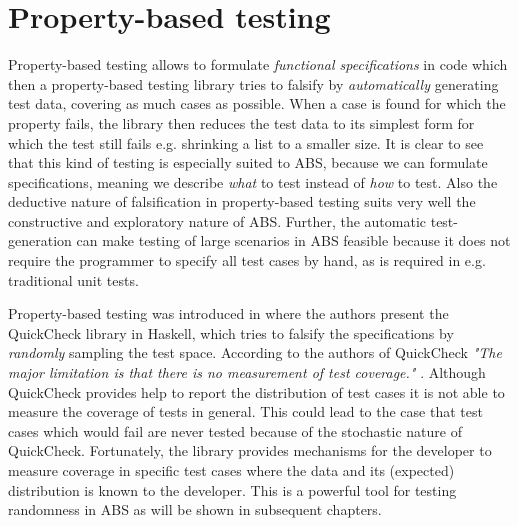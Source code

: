 \section*{Property-based testing}
\label{sec:proptesting}

Property-based testing allows to formulate \textit{functional specifications} in code which then a property-based testing library tries to falsify by \textit{automatically} generating test data, covering as much cases as possible. When a case is found for which the property fails, the library then reduces the test data to its simplest form for which the test still fails e.g. shrinking a list to a smaller size. It is clear to see that this kind of testing is especially suited to ABS, because we can formulate specifications, meaning we describe \textit{what} to test instead of \textit{how} to test. Also the deductive nature of falsification in property-based testing suits very well the constructive and exploratory nature of ABS. Further, the automatic test-generation can make testing of large scenarios in ABS feasible because it does not require the programmer to specify all test cases by hand, as is required in e.g. traditional unit tests.

Property-based testing was introduced in \cite{claessen_quickcheck_2000,claessen_testing_2002} where the authors present the QuickCheck library in Haskell, which tries to falsify the specifications by \textit{randomly} sampling the test space. %
According to the authors of QuickCheck \textit{"The major limitation is that there is no measurement of test coverage."} \cite{claessen_quickcheck_2000}. Although QuickCheck provides help to report the distribution of test cases it is not able to measure the coverage of tests in general. This could lead to the case that test cases which would fail are never tested because of the stochastic nature of QuickCheck. Fortunately, the library provides mechanisms for the developer to measure coverage in specific test cases where the data and its (expected) distribution is known to the developer. This is a powerful tool for testing randomness in ABS as will be shown in subsequent chapters.

